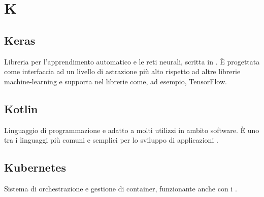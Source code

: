 \section*{K}
\markright{}
\subsection*{Keras}
Libreria  per l'apprendimento automatico e le reti neurali, scritta in . È progettata come interfaccia ad un livello di astrazione più alto rispetto ad altre librerie machine-learning e supporta nel  librerie come, ad esempio, TensorFlow.

\subsection*{Kotlin}
Linguaggio di programmazione  e adatto a molti utilizzi in ambito software. È uno tra i linguaggi più comuni e semplici per lo sviluppo di applicazioni .  

\subsection*{Kubernetes}
Sistema  di orchestrazione e gestione di container, funzionante anche con i .